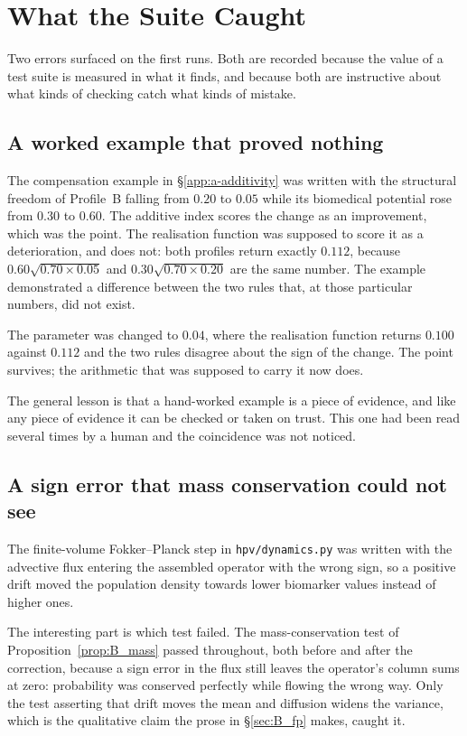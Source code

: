 \section{What the Suite Caught}
\label{sec:F_found}

Two errors surfaced on the first runs. Both are recorded because the value of a
test suite is measured in what it finds, and because both are instructive about
what kinds of checking catch what kinds of mistake.

\subsection{A worked example that proved nothing}

The compensation example in \S\ref{app:a-additivity} was written with the
structural freedom of Profile~B falling from $0.20$ to $0.05$ while its
biomedical potential rose from $0.30$ to $0.60$. The additive
index scores the change as an improvement, which was the point. The realisation
function was supposed to score it as a deterioration, and does not: both
profiles return exactly $0.112$, because
$0.60\sqrt{0.70\times0.05}$ and $0.30\sqrt{0.70\times0.20}$ are the same
number. The example demonstrated a difference between the two rules that, at
those particular numbers, did not exist.

The parameter was changed to $0.04$, where the realisation function returns
$0.100$ against $0.112$ and the two rules disagree about the sign of the
change. The point survives; the arithmetic that was supposed to carry it now
does.

The general lesson is that a hand-worked example is a piece of evidence, and
like any piece of evidence it can be checked or taken on trust. This one had
been read several times by a human and the coincidence was not noticed.

\subsection{A sign error that mass conservation could not see}

The finite-volume Fokker--Planck step in \texttt{hpv/dynamics.py} was written
with the advective flux entering the assembled operator with the wrong sign, so
a positive drift moved the population density towards lower biomarker values
instead of higher ones.

The interesting part is which test failed. The mass-conservation test of
Proposition~\ref{prop:B_mass} passed throughout, both before and after the
correction, because a sign error in the flux still leaves the operator's column
sums at zero: probability was conserved perfectly while flowing the wrong way.
Only the test asserting that drift moves the mean and diffusion widens the
variance, which is the qualitative claim the prose in \S\ref{sec:B_fp} makes,
caught it.

